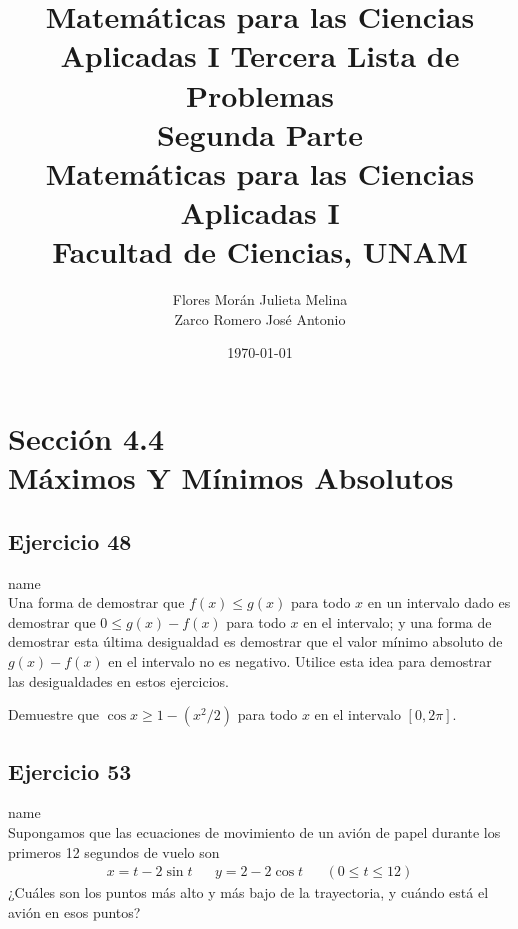 \documentclass[12pt]{article}
\title{Matemáticas para las Ciencias Aplicadas I}
\title{
	Tercera Lista de Problemas \\
	\textbf{Segunda  Parte} \\
	\vspace{1ex}
	\large Matemáticas para las Ciencias Aplicadas I \\
	Facultad de Ciencias, UNAM}
\date{\today}
\author{Flores Morán Julieta Melina \\ Zarco Romero José Antonio}
\begin{document}
\maketitle


\section{Sección 4.4 \\ Máximos Y Mínimos Absolutos}
\subsection{Ejercicio 48} name \\

Una forma de demostrar que $f(x) \leq g(x)$ para todo $x$ en un intervalo dado es demostrar que $0 \leq g(x)-f(x)$ para todo $x$ en el intervalo; y una forma de demostrar esta última desigualdad es demostrar que el valor mínimo absoluto de $g(x)-f(x)$ en el intervalo no es negativo. Utilice esta idea para demostrar las desigualdades en estos ejercicios.

Demuestre que $\cos{x} \geq 1-(x^2 /2)$ para todo $x$ en el intervalo $[0, 2\pi]$.

\subsection{Ejercicio 53} name \\

Supongamos que las ecuaciones de movimiento de un avión de papel durante los primeros 12 segundos de vuelo son
\begin{align*}
  x=t-2\sin{t} && y=2-2\cos{t} && (0\leq t\leq 12)
\end{align*}
¿Cuáles son los puntos más alto y más bajo de la trayectoria, y cuándo está el avión en esos puntos?
\end{document}
